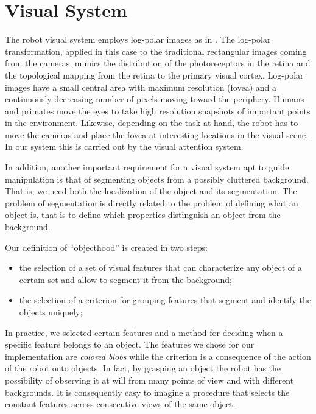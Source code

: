 \section{Visual System}
\label{sect:vision}

The robot visual system employs log-polar images as in \cite{sandini80retinalike}. The log-polar transformation, applied in this case to the traditional rectangular images coming from the cameras, mimics the distribution of the photoreceptors in the retina and the topological mapping from the retina to the primary visual cortex. Log-polar images have a small central area with maximum resolution (fovea) and a continuously decreasing number of pixels moving toward the periphery. 
Humans and primates move the eyes to take high resolution snapshots of important points in the environment. Likewise, depending on the task at hand, the robot has to move the cameras and place the fovea at interesting locations in the visual scene. In our system this is carried out by the visual attention system.

In addition, another important requirement for a visual system apt to guide manipulation is that of segmenting objects from a possibly cluttered background. That is, we need both the localization of the object and its segmentation. The problem of segmentation is directly related to the problem of defining what an object is, that is to define which properties distinguish an object from the background.

Our definition of ``objecthood'' is created in two steps:
\begin{itemize}
\item the selection of a set of visual features that can characterize any object of a certain set and allow to segment it from the background;
\item the selection of a criterion for grouping features that segment and identify the objects uniquely;
\end{itemize}
\noindent In practice, we selected certain features and a method for deciding when a specific feature belongs to an object. The features we chose for our implementation are {\em colored blobs} while the criterion is a consequence of the action of the robot onto objects. In fact, by grasping an object the robot has the possibility of observing it at will from many points of view and with different backgrounds. It is consequently easy to imagine a procedure that selects the constant features across consecutive views of the same object.

